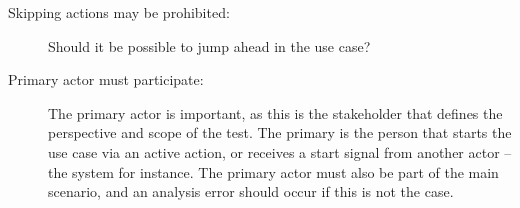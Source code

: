 \begin{description}
  \item[Skipping actions may be prohibited:] Should it be possible to jump ahead in the use case?
  \item[Primary actor must participate:] The primary actor is important, as this is the stakeholder that defines the perspective and scope of the test. The primary is the person that starts the use case via an active action, or receives a start signal from another actor -- the system for instance. The primary actor must also be part of the main scenario, and an analysis error should occur if this is not the case.

\end{description}











